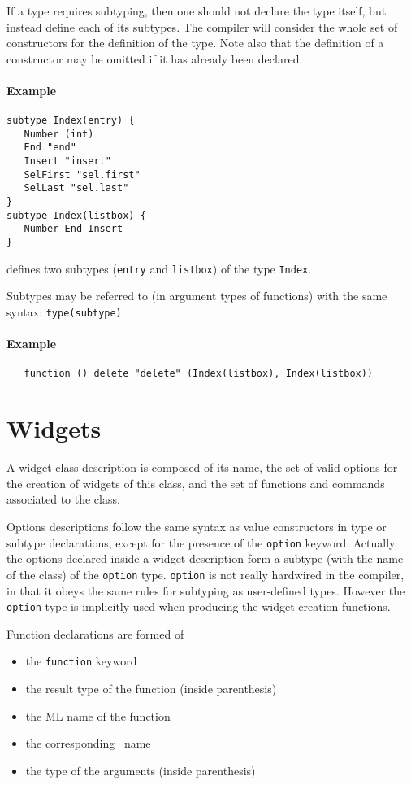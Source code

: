 If a type requires subtyping, then one should not declare the type itself,
but instead define each of its subtypes. The compiler will consider the
whole set of constructors for the definition of the type. Note also that the
definition of a constructor may be omitted if it has  already been declared.

\paragraph{Example}
\begin{verbatim}
subtype Index(entry) {
   Number (int)
   End "end"
   Insert "insert"
   SelFirst "sel.first"
   SelLast "sel.last" 
}
subtype Index(listbox) {
   Number End Insert 
}
\end{verbatim}
defines two subtypes (\verb|entry| and \verb|listbox|) of the type
\verb|Index|.  

Subtypes may be referred to (in argument types of functions) with the same
syntax: \verb|type(subtype)|.
\paragraph{Example}
\begin{verbatim}
   function () delete "delete" (Index(listbox), Index(listbox))
\end{verbatim} 

\section{Widgets}
A widget class description is composed of its name, the set of valid options
for the creation of widgets of this class, and the set of functions and
commands associated to the class.

Options descriptions follow the same syntax as value constructors in type or
subtype declarations, except for the presence of the \verb|option| keyword.
Actually, the options declared inside a widget description form a subtype
(with the name of the class) of the \verb|option| type. 
\verb|option| is not really hardwired in the compiler, in that it obeys the
same rules for subtyping as user-defined types. However the \verb|option|
type is implicitly used when producing the widget creation functions.

Function declarations are formed of
\begin{itemize}
\item the \verb|function| keyword
\item the result type of the function (inside parenthesis)
\item the ML name of the function
\item the corresponding \tk\ name
\item the type of the arguments (inside parenthesis)
\end{itemize} 

